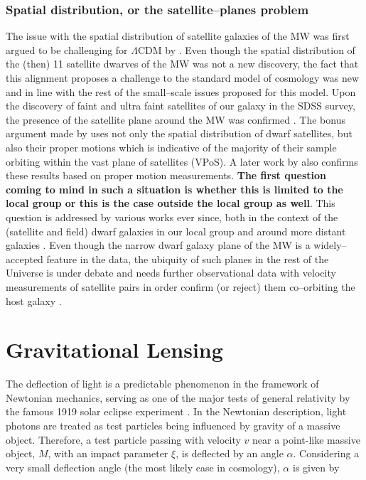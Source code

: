 \documentclass[a4wide,12pt]{book}
\begin{document}
{\subsection{Spatial distribution, or the satellite--planes problem}
The issue with the spatial distribution of satellite galaxies of the MW was first argued to be challenging for $\Lambda$CDM by \citet[][]{Ktoupa+2005}. Even though the spatial distribution of the (then) 11 satellite dwarves of the MW was not a new discovery, the fact that this alignment proposes a challenge to the standard model of cosmology was new and in line with the rest of the small--scale issues proposed for this model. Upon the discovery of faint and ultra faint satellites of our galaxy in the SDSS survey, the presence of the satellite plane around the MW was confirmed \citep[][]{Metz+2009, Kroupa+2010}. The bonus argument made by \citet[][]{Metz+2009} uses not only the spatial distribution of dwarf satellites, but also their proper motions which is indicative of the majority of their sample orbiting within the vast plane of satellites (VPoS). A later work by \citet[][]{Pawlowski+2013} also confirms these results based on proper motion measurements. {\bf The first question coming to mind in such a situation is whether this is limited to the local group or this is the case outside the local group as well}. This question is addressed by various works ever since, both in the context of the (satellite and field) dwarf galaxies in our local group \citep[see e.g. ][]{Ibata+2013, Pawlowski+2013, Bellazzini+2013, Pawlowski.McGaugh2014a} and around more distant galaxies \citep[see e.g. ][]{Tully+2015, Muller+2015}. Even though the narrow dwarf galaxy plane of the MW is a widely--accepted feature in the data, the ubiquity of such planes in the rest of the Universe is under debate and needs further observational data with velocity measurements of satellite pairs in order confirm (or reject) them co--orbiting the host galaxy \citet[for opposite views on the matter see e.g. ][]{Phillips+2015, Cautun+2015}.


\chapter{Gravitational Lensing}
\label{sec:Gravitational lensing}

The deflection of light is a predictable phenomenon in the framework of Newtonian mechanics, serving as one of the major tests of general relativity by the famous 1919 solar eclipse experiment \citep[][]{Eddington+1919}. In the Newtonian description, light photons are treated as test particles being influenced by gravity of a massive object. Therefore, a test particle passing with velocity $v$ near a point-like massive object, $M$, with an impact parameter $\xi$, is deflected by an angle $\alpha$. Considering a very small deflection angle (the most likely case in cosmology), $\alpha$ is given by

}
\end{document}
